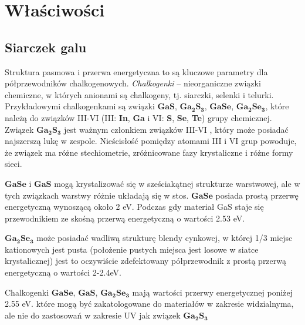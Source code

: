 \newpage

\section{Właściwości}

\subsection{Siarczek galu}
Struktura pasmowa i przerwa energetyczna to są kluczowe parametry dla półprzewodników chalkogenowych. \textit{Chalkogenki} – nieorganiczne związki chemiczne, w których anionami są chalkogeny, tj. siarczki, selenki i telurki. Przykładowymi chalkogenkami są związki $\mathbf{GaS}$, $\mathbf{Ga_{2}S_{3}}$, $\mathbf{GaSe}$, $\mathbf{Ga_{2}Se_{3}}$, które należą do związków III-VI (III: \textbf{In}, \textbf{Ga} i VI: \textbf{S}, \textbf{Se}, \textbf{Te}) grupy chemicznej. Związek $\mathbf{Ga_{2}S_{3}}$ jest ważnym członkiem związków III-VI , który może posiadać najszerszą lukę w zespole. Nieścisłość pomiędzy atomami III i VI grup powoduje, że związek ma różne stechiometrie, zróżnicowane fazy krystaliczne i różne formy sieci.

$\mathbf{GaSe}$ i $\mathbf{GaS}$ mogą krystalizować się w sześciakątnej strukturze warstwowej, ale w tych związkach warstwy różnie układają się w stos. $\mathbf{GaSe}$ posiada prostą przerwę energetyczną wynoszącą około 2 eV. Podczas gdy materiał GaS staje się przewodnikiem ze skośną przerwą energetyczną o wartości 2.53 eV.

$\mathbf{Ga_{2}Se_{3}}$ może posiadać wadliwą strukturę blendy cynkowej, w której 1/3 miejsc kationowych jest pusta (położenie pustych miejsca jest losowe w siatce krystalicznej) jest to oczywiście zdefektowany półprzewodnik z prostą przerwą energetyczną o wartości 2-2.4eV.

Chalkogenki $\mathbf{GaSe}$, $\mathbf{GaS}$, $\mathbf{Ga_{2}Se_{3}}$ mają wartości przerwy energetycznej poniżej 2.55 eV. które mogą być zakatologowane do materiałów w zakresie widzialnyma, ale nie do zastosowań w zakresie UV jak związek $\mathbf{Ga_{2}S_{3}}$

